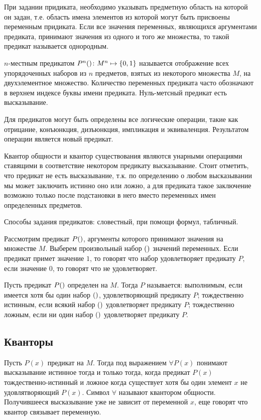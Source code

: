 \documentclass[letterpaper, 10pt]{article}
\theoremstyle{definition}
\begin{document}
	При задании придиката, необходимо указывать предметную область на которой он
	задан, т.е. область имена элементов из которой могут быть присвоены переменным
	придиката. Если
	все значения переменных, являющихся аргументами предиката, принимают значения
	из одного и того же множества, то такой предикат называется однородным.

	$n$-местным предикатом $P^n(\rseq x)\colon M^n \mapsto \set{0,1}$ называется
	отображение всех упорядоченных наборов из $n$ предметов, взятых из некоторого множества
	$M$, на двухэлементное множество.
	Количество переменных предиката часто обозначают в верхнем индексе
	буквы имени предиката. Нуль-метсный предикат есть высказывание.

	Для предикатов могут быть определены все логические операции, такие как
	отрицание, конъюнкция, дизъюнкция, импликация и эквиваленция. Результатом
	операции является новый предикат.

	Квантор общности и квантор существования являются унарными операциями
	ставящими в соответствие некотором предикату высказывание. Стоит отметить,
	что предикат не есть высказывание, т.к. по определению о любом высказывании
	мы может заключить истинно оно или ложно, а для предиката такое заключение
	возможно только после подстановки в него вместо переменных имен определенных
	предметов.

	Способы задания предикатов: словестный, при помощи формул, табличный.

	Рассмотрим предикат $P(\rseq x)$, аргументы которого принимают
	значения на множестве $M$. Выберем произвольный набор $(\rseq a)$
	значений переменных. Если предикат примет значение $1$, то говорят что набор
	удовлетворяет предикату $P$, если значение $0$, то говорят что не
	удовлетворяет.

	Пусть предикат $P(\rseq x)$ определен на $M$. Тогда $P$ называется:
	выполнимым, если имеется хотя бы один набор $(\rseq a)$, удовлетворяющий
	предикату $P$;
	тождественно истинным, если всякий набор $(\rseq a)$ удовлетворяет предикату
	$P$;
	тождественно ложным, если ни один набор  $(\rseq a)$ удовлетворяет предикату
	$P$.

	\subsection{Кванторы}
	Пусть $P(x)$ предикат на $M$. Тогда под выражением $\forall P(x)$ понимают
	высказывание истинное тогда и только тогда, когда предикат $P(x)$
	тождественно-истинный и ложное когда существует хотя бы один элемент $x$ не
	удовлятворяющий $P(x)$.
	Символ $\forall$ называют квантором общности. Получившееся высказывание уже
	не зависит от переменной $x$, еще говорят что квантор связывает переменную.
\end{document}
